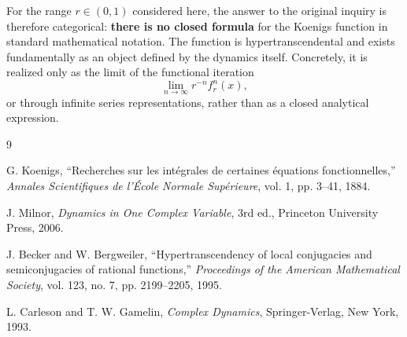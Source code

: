 \documentclass[11pt, a4paper]{article}
\theoremstyle{definition}
\begin{document}
For the range $r \in (0,1)$ considered here, the answer to the original inquiry is therefore categorical: \textbf{there is no closed formula} for the Koenigs function in standard mathematical notation. The function is hypertranscendental and exists fundamentally as an object defined by the dynamics itself. Concretely, it is realized only as the limit of the functional iteration
\[
\lim_{n \to \infty} r^{-n} f_r^n(x),
\]
or through infinite series representations, rather than as a closed analytical expression.

\begin{thebibliography}{9}

G. Koenigs,
``Recherches sur les intégrales de certaines équations fonctionnelles,''
\textit{Annales Scientifiques de l'École Normale Supérieure}, vol. 1, pp. 3--41, 1884.

J. Milnor,
\textit{Dynamics in One Complex Variable}, 3rd ed.,
Princeton University Press, 2006.

J. Becker and W. Bergweiler,
``Hypertranscendency of local conjugacies and semiconjugacies of rational functions,''
\textit{Proceedings of the American Mathematical Society}, vol. 123, no. 7, pp. 2199--2205, 1995.

L. Carleson and T. W. Gamelin,
\textit{Complex Dynamics},
Springer-Verlag, New York, 1993.

\end{thebibliography}
\end{document}
